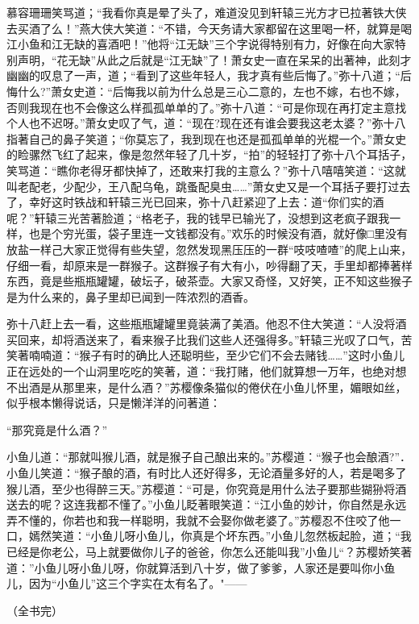 \documentclass[12pt,oneside]{book}
\begin{document}
慕容珊珊笑骂道；``我看你真是晕了头了，难道没见到轩辕三光方才已拉著铁大侠去买酒了么！''燕大侠大笑道：``不错，今天务请大家都留在这里喝一杯，就算是喝江小鱼和江无缺的喜酒吧！''他将``江无缺''三个字说得特别有力，好像在向大家特别声明，``花无缺''从此之后就是``江无缺''了！萧女史一直在呆呆的出著神，此刻才幽幽的叹息了一声，道；``看到了这些年轻人，我才真有些后悔了。''弥十八道；``后悔什么?''萧女史道：``后悔我以前为什么总是三心二意的，左也不嫁，右也不嫁，否则我现在也不会像这么样孤孤单单的了。''弥十八道：``可是你现在再打定主意找个人也不迟呀。''萧女史叹了气，道：``现在?现在还有谁会要我这老太婆？''弥十八指著自己的鼻子笑道；``你莫忘了，我到现在也还是孤孤单单的光棍一个。''萧女史的睑骡然飞红了起来，像是忽然年轻了几十岁，``拍''的轻轻打了弥十八个耳括子，笑骂道：``瞧你老得牙都快掉了，还敢来打我的主意么？''弥十八嘻嘻笑道：``这就叫老配老，少配少，王八配乌龟，跳蚤配臭虫\ldots\ldots{}''萧女史又是一个耳括子要打过去了，幸好这时铁战和轩辕三光已回来，弥十八赶紧迎了上去：道``你们实的酒呢？''轩辕三光苦著脸道；``格老子，我的钱早已输光了，没想到这老疯子跟我一样，也是个穷光蛋，袋子里连一文钱都没有。''欢乐的时候没有酒，就好像□里没有放盐一样己大家正觉得有些失望，忽然发现黑压压的一群``吱吱喳喳''的爬上山来，仔细一看，却原来是一群猴子。这群猴子有大有小，吵得翻了天，手里却都捧著样东西，竟是些瓶瓶罐罐，破坛子，破茶壶。大家又奇怪，又好笑，正不知这些猴子是为什么来的，鼻子里却已闻到一阵浓烈的酒香。

弥十八赶上去一看，这些瓶瓶罐罐里竟装满了美酒。他忍不住大笑道：``人没将酒买回来，却将酒送来了，看来猴子比我们这些人还强得多。''轩辕三光叹了口气，苦笑著喃喃道：``猴子有时的确比人还聪明些，至少它们不会去赌钱\ldots\ldots{}''这时小鱼儿正在远处的一个山洞里吃吃的笑著，道：``我打赌，他们就算想一万年，也绝对想不出酒是从那里来，是什么酒？''苏樱像条猫似的倦伏在小鱼儿怀里，媚眼如丝，似乎根本懒得说话，只是懒洋洋的问著道：

``那究竟是什么酒？''

小鱼儿道：``那就叫猴儿酒，就是猴子自己酿出来的。''苏樱道：``猴子也会酿酒?''．小鱼儿笑道：``猴子酿的酒，有时比人还好得多，无论酒量多好的人，若是喝多了猴儿酒，至少也得醉三天。''苏樱道：``可是，你究竟是用什么法子要那些猢狲将酒送去的呢？这连我都不懂了。''小鱼儿眨著眼笑道：``江小鱼的妙计，你自然是永远弄不懂的，你若也和我一样聪明，我就不会娶你做老婆了。''苏樱忍不住咬了他一口，嫣然笑道：``小鱼儿呀小鱼儿，你真是个坏东西。''小鱼儿忽然板起脸，道；``我已经是你老公，马上就要做你儿子的爸爸，你怎么还能叫我''小鱼儿``？苏樱娇笑著道：''小鱼儿呀小鱼儿呀，你就算活到八十岁，做了爹爹，人家还是要叫你小鱼儿，因为``小鱼儿''这三个字实在太有名了。"------

（全书完）

\backmatter
\end{document}

